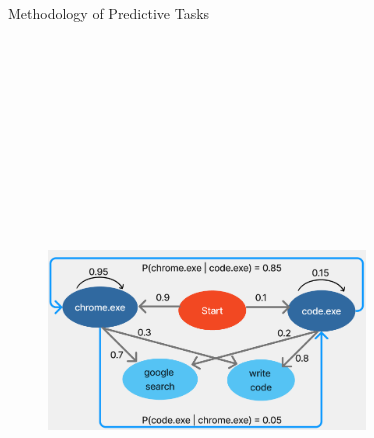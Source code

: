 \documentclass[final]{beamer}
\newlength{\colwidth}
\begin{document}
\begin{frame}[t]
\begin{columns}[t]
\begin{column}{\colwidth}
\begin{exampleblock}{\huge{Methodology of Predictive Tasks}}
{\begin{itemize}
                    \begin{figure}\includegraphics[width=0.75\textwidth, height=16cm]{hmm3.jpeg}\end{figure}

            
            
          \end{itemize}

}
\end{exampleblock}
\end{column}
\end{columns}
\end{frame}
\end{document}
